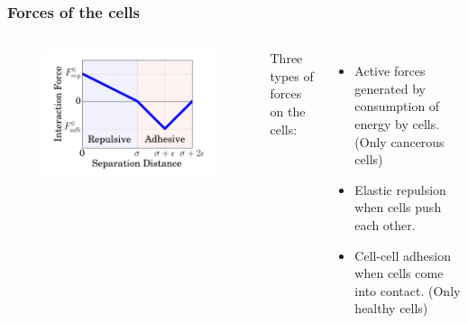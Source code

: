 \documentclass{beamer}
\begin{document}
  \begin{frame}
    \frametitle{Forces of the cells}
  	\begin{columns}[t] 
    \begin{figure}
      \includegraphics[width=1.0\columnwidth]{interaction.png}
    \end{figure}
    Three types of forces on the cells:
    \begin{itemize}
    \item Active forces generated by consumption of energy by cells. (Only cancerous cells)
    \item Elastic repulsion when cells push each other. 
    \item Cell-cell adhesion when cells come into contact. (Only healthy cells)
    \end{itemize}
    \end{columns}
    \vfill
  \end{frame}
\end{document}
